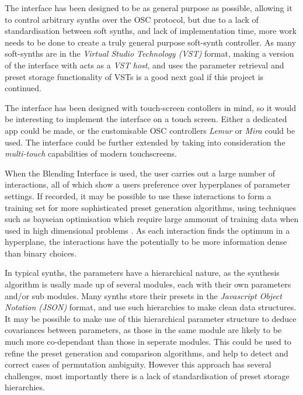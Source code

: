 \documentclass[11pt, oneside]{report}   	%
\begin{document}
The interface has been designed to be as general purpose as possible, allowing it to control arbitrary synths over the OSC protocol, but due to a lack of standardisation between soft synths, and lack of implementation time, more work needs to be done to create a truly general purpose soft-synth controller. As many soft-synths are in the \emph{Virtual Studio Technology (VST)} format, making a version of the interface with acts as a \emph{VST host}, and uses the parameter retrieval and preset storage functionality of VSTs is a good next goal if this project is continued.

The interface has been designed with touch-screen contollers in mind, so it would be interesting to implement the interface on a touch screen. Either a dedicated app could be made, or the customisable OSC controllers \emph{Lemur} or \emph{Mira} could be used. The interface could be further extended by taking into consideration the \emph{multi-touch} capabilities of modern touchscreens.

When the Blending Interface is used, the user carries out a large number of interactions, all of which show a users preference over hyperplanes of parameter settings. If recorded, it may be possible to use these interactions to form a training set for more sophisticated preset generation algorithms, using techniques such as bayseian optimisation which require large ammount of training data when used in high dimensional problems \cite{PreferenceGallery}. As each interaction finds the optimum in a hyperplane, the interactions have the potentially to be more information dense than binary choices.
%

In typical synths, the parameters have a hierarchical nature, as the synthesis algorithm is usally made up of several modules, each with their own parameters and/or sub modules. Many synths store their presets in the \emph{Javascript Object Notation (JSON)} format, and use such hierarchies to make clean data structures. It may be possible to make use of this hierarchical parameter structure to deduce covariances between parameters, as those in the same module are likely to be much more co-dependant than those in seperate modules. This could be used to refine the preset generation and comparison algorithms, and help to detect and correct cases of permutation ambiguity. However this approach has several challenges, most importantly there is a lack of standardisation of preset storage hierarchies.
\end{document}
